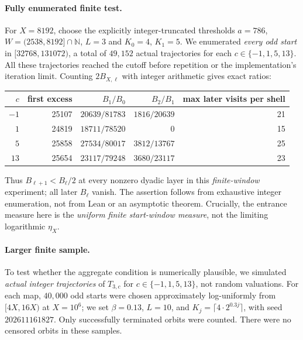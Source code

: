 \documentclass[11pt,a4paper]{article}
\theoremstyle{remark}
\begin{document}
\paragraph{Fully enumerated finite test.}
For $X=8192$, choose the explicitly integer-truncated thresholds
$a=786$, $W=(2538,8192]\cap\mathbb N$, $L=3$ and
$K_0=4$, $K_1=5$.  We enumerated \emph{every odd start} in
$[32768,131072)$, a total of $49{,}152$ actual trajectories for each
$c\in\{-1,1,5,13\}$.  All these trajectories reached the cutoff
before repetition or the implementation's iteration limit.  Counting
$2B_{X,\ell}$ with integer arithmetic gives exact ratios:
\begin{center}
\begin{tabular}{@{}rrrrr@{}}
\toprule
$c$ & first excess & $B_1/B_0$ & $B_2/B_1$ & max later visits per shell\\
\midrule
$-1$ & 25107 & $20639/81783$ & $1816/20639$ & 21\\
$1$ & 24819 & $18711/78520$ & $0$ & 15\\
$5$ & 25858 & $27534/80017$ & $3812/13767$ & 25\\
$13$ & 25654 & $23117/79248$ & $3680/23117$ & 23\\
\bottomrule
\end{tabular}
\end{center}
Thus $B_{\ell+1}<B_\ell/2$ at every nonzero dyadic layer
in this \emph{finite-window} experiment; all later $B_\ell$ vanish.
The assertion follows from exhaustive integer enumeration, not from
Lean or an asymptotic theorem.  Crucially, the entrance measure here
is the \emph{uniform finite start-window measure}, not the limiting
logarithmic $\eta_X$.

\paragraph{Larger finite sample.}
To test whether the aggregate condition is numerically plausible,
we simulated \emph{actual integer trajectories} of $T_{3,c}$ for
$c\in\{-1,1,5,13\}$, not random valuations.  For each map,
$40{,}000$ odd starts were chosen approximately log-uniformly from
$[4X,16X)$ at $X=10^6$; we set $\beta=0.13$, $L=10$, and
$K_j=\lceil4\cdot2^{0.3j}\rceil$, with seed $202611161827$.
Only successfully terminated orbits were counted.  There were no
censored orbits in these samples.
\end{document}

